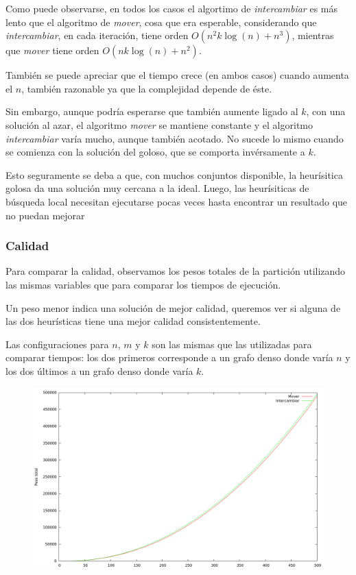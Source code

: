 \vspace*{0.5cm}


Como puede observarse, en todos los casos el algortimo de \textit{intercambiar}
es más lento que el algoritmo de \textit{mover}, cosa que era esperable,
considerando que \textit{intercambiar}, en cada iteración, tiene orden
$O(n^2k\log(n) + n^3)$, mientras que \textit{mover} tiene orden $O(nk\log(n) +
n^2)$.

También se puede apreciar que el tiempo crece (en ambos casos) cuando aumenta
el $n$, también razonable ya que la complejidad depende de éste.

Sin embargo, aunque podría esperarse que también aumente ligado al $k$, con una
solución al azar, el algoritmo \textit{mover} se mantiene constante y el
algoritmo \textit{intercambiar} varía mucho, aunque también acotado. No sucede
lo mismo cuando se comienza con la solución del goloso, que se comporta
invérsamente a $k$.

Esto seguramente se deba a que, con muchos conjuntos disponible, la heurísitica
golosa da una solución muy cercana a la ideal. Luego, las heurísiticas de
búsqueda local necesitan ejecutarse pocas veces hasta encontrar un resultado
que no puedan mejorar


\newpage \subsubsection{Calidad}

Para comparar la calidad, observamos los pesos totales de la partición
utilizando las mismas variables que para comparar los tiempos de ejecución.

Un peso menor indica una solución de mejor calidad, queremos ver si alguna
de las dos heurísticas tiene una mejor calidad consistentemente.

Las configuraciones para $n$, $m$ y $k$ son las mismas que las utilizadas para
comparar tiempos: los dos primeros corresponde a un grafo denso donde varía $n$
y los dos últimos a un grafo denso donde varía $k$.

\vspace*{0.5cm}

\begin{figure}[H]
  \begin{center}
    \includegraphics[scale=0.35]{imagenes/local-goloso-n-peso.png}
  \end{center}
\end{figure}

